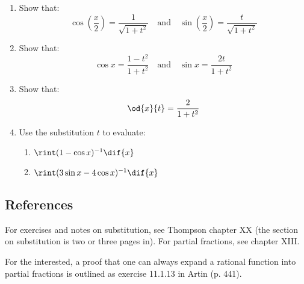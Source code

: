 \begin{enumerate}[resume]
    \begin{enumerate}
      \item Show that:
            \begin{displaymath}
              \cos\left( \frac{x}{2} \right) = \frac{1}{\sqrt{1 + t^2}} \quad\text{and}\quad \sin\left(\frac{x}{2}\right) = \frac{t}{\sqrt{1 + t^2}}
            \end{displaymath}
      \item Show that:
            \begin{displaymath}
              \cos x = \frac{1 - t^2}{1 + t^2} \quad\text{and}\quad \sin x = \frac{2t}{1 + t^2}
            \end{displaymath}
      \item Show that:
            \begin{displaymath}
              \od{x}{t} = \frac{2}{1 + t^2}
            \end{displaymath}
      \item Use the substitution $ t $ to evaluate:
        \begin{enumerate}
          \item $ \rint (1 - \cos x)^{-1} \dif{x} $
          \item $ \rint (3\sin x - 4\cos x)^{-1} \dif{x} $
        \end{enumerate}
    \end{enumerate}
\end{enumerate}

\subsection{References}
For exercises and notes on substitution, see Thompson chapter XX (the section on substitution
is two or three pages in). For partial fractions, see chapter XIII.

For the interested, a proof that one can always expand a rational function into partial fractions
is outlined as exercise 11.1.13 in Artin (p. 441).


